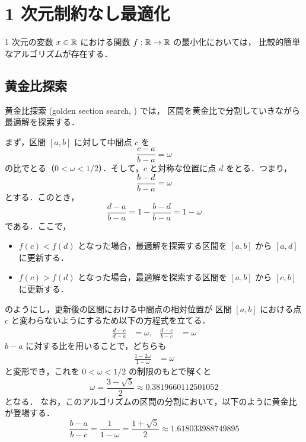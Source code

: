 %

\chapter{1 次元制約なし最適化}

1 次元の変数 $x \in \mathbb{R}$ における関数 $f : \mathbb{R} \to \mathbb{R}$ の最小化においては，
比較的簡単なアルゴリズムが存在する．

\section{黄金比探索}\label{sec:optimization_golden-section-search}

黄金比探索 (golden section search, \cite[10.2]{Press2007}) では，
区間を黄金比で分割していきながら最適解を探索する．

まず，区間 $[a,b]$ に対して中間点 $c$ を
\begin{equation}
    \frac{c - a}{b - a} = \omega
\end{equation}
の比でとる（$0 < \omega < 1/2$）．そして，$c$ と対称な位置に点 $d$ をとる．つまり，
\begin{equation}
    \frac{b - d}{b - a} = \omega
\end{equation}
とする．このとき，
\begin{equation}
    \frac{d - a}{b - a} = 1 - \frac{b - d}{b - a} = 1 - \omega
\end{equation}
である．ここで，
\begin{itemize}
    \item $f(c) < f(d)$ となった場合，最適解を探索する区間を $[a, b]$ から $[a, d]$ に更新する．
    \item $f(c) > f(d)$ となった場合，最適解を探索する区間を $[a, b]$ から $[c, b]$ に更新する．
\end{itemize}
のようにし，更新後の区間における中間点の相対位置が
区間 $[a, b]$ における点 $c$ と変わらないようにするため以下の方程式を立てる．
\begin{align}
    \frac{d - c}{d - a} &= \omega, &
    \frac{d - c}{b - c} &= \omega
\end{align}
$b - a$ に対する比を用いることで，どちらも
\begin{align}
    \frac{1 - 2\omega}{1 - \omega} &= \omega
\end{align}
と変形でき，これを $0 < \omega < 1/2$ の制限のもとで解くと
\begin{equation}
    \omega = \frac{3 - \sqrt{5}}{2} \approx 0.3819660112501052
\end{equation}
となる．
なお，このアルゴリズムの区間の分割において，以下のように黄金比が登場する．
\begin{equation}
    \frac{b - a}{b - c} = \frac{1}{1 - \omega} = \frac{1 + \sqrt{5}}{2} \approx 1.618033988749895
\end{equation}
